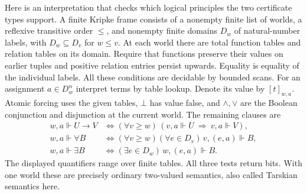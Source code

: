 Here is an interpretation that checks which logical principles the two
certificate types support. A finite Kripke frame consists of a nonempty
finite list of worlds, a reflexive transitive order $\leq$, and nonempty
finite domains $D_w$ of natural-number labels, with $D_w\subseteq D_v$ for
$w\leq v$. At each world there are total function tables and relation
tables on its domain. Require that functions preserve their values on
earlier tuples and positive relation entries persist upwards. Equality is
equality of the individual labels. All these conditions are decidable
by bounded scans. For an assignment $a\in D_w^n$ interpret terms by table
lookup. Denote its value by $[t]_{w,a}$. Atomic forcing uses the given
tables, $\bot$ has value false, and $\wedge,\vee$ are the Boolean
conjunction and disjunction at the current world. The remaining clauses
are
\[
\begin{aligned}
 w,a\Vdash U\to V
    &\iff (\forall v\ge w)\,(v,a\Vdash U\ \Rightarrow\ v,a\Vdash V),\\
 w,a\Vdash\forall B
    &\iff (\forall v\ge w)(\forall e\in D_v)\,v,(e,a)\Vdash B,\\
 w,a\Vdash\exists B
    &\iff (\exists e\in D_w)\,w,(e,a)\Vdash B .
\end{aligned}
\]
The displayed quantifiers range over finite tables. All three tests
return bits. With one world these are precisely ordinary two-valued
semantics, also called Tarskian semantics here.

